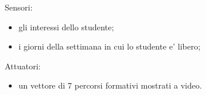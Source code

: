 \documentclass[10pt,a4paper]{article}
\begin{document}
        Sensori:
        \begin{itemize}
          \item gli interessi dello studente;
          \item i giorni della settimana in cui lo studente e' libero;
        \end{itemize}
        
        Attuatori:
        \begin{itemize}
          \item un vettore di 7 percorsi formativi mostrati a video.
        \end{itemize}
\end{document}
